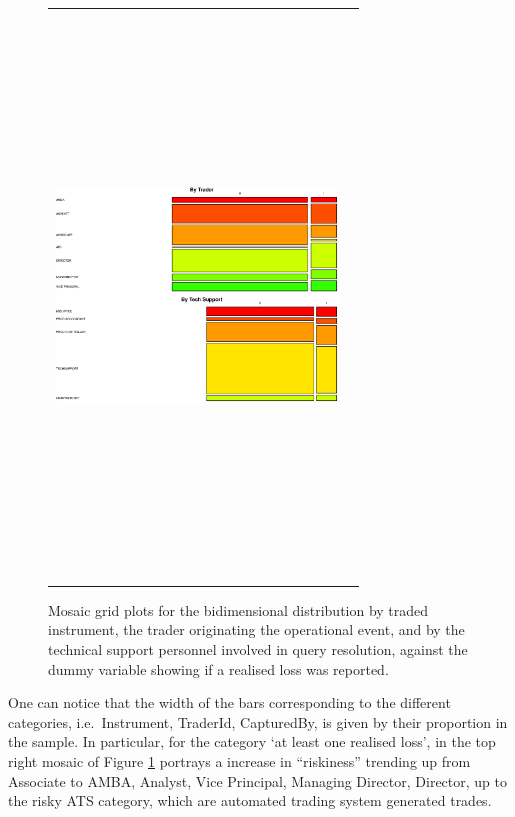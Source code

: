 \documentclass{DissertateUSU}
\begin{document}
\begin{figure}
\begin{frame}
\begin{tabular}{cc}
         \includegraphics[width=7.5cm,height=15cm]{Stacked_TrId_TechSup.eps}
         \end{tabular}
    \end{frame}
    \caption{Mosaic grid plots for the bidimensional distribution by traded instrument, the trader originating the operational event, and by the technical support personnel involved in query resolution, against the dummy variable showing if a realised loss was reported.}
    \label{Mosaic_Instr_Trd_Tec}
\end{figure}

One can notice that the width of the bars corresponding to the different
categories, i.e.~Instrument, TraderId, CapturedBy, is given by their
proportion in the sample. In particular, for the category `at least one
realised loss', in the top right mosaic of Figure
\ref{Mosaic_Instr_Trd_Tec} portrays a increase in ``riskiness'' trending
up from Associate to AMBA, Analyst, Vice Principal, Managing Director,
Director, up to the risky ATS category, which are automated trading
system generated trades.\medskip
\end{document}
